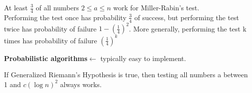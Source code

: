 \documentclass[9pt, letterpaper, oneside]{article}
\begin{document}
At least $\frac{3}{4}$ of all numbers $2 \leq a \leq n$ work for Miller-Rabin's test.\\
Performing the test once has probability $ \displaystyle \frac{3}{4}$ of success, but performing the test twice has probability of failure $\displaystyle 1 - (\frac{1}{4})^2$. More generally, performing the test k times has probability of failure $\displaystyle (\frac{1}{4})^k$

\textbf{Probabilistic algorithms}$\leftarrow$ typically easy to implement.

If Generalized Riemann's Hypothesis is true, then testing all numbers a between 1 and $c(\log n)^2$ always works.
\end{document}
